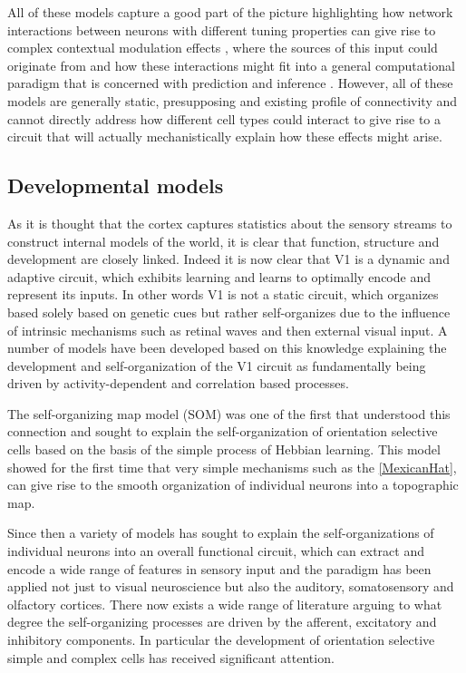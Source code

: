 All of these models capture a good part of the picture highlighting
how network interactions between neurons with different tuning
properties can give rise to complex contextual modulation effects
\citep{Li2002}, where the sources of this input could originate from
\citep{Schwabe2006} and how these interactions might fit into a
general computational paradigm that is concerned with prediction and
inference \citep{Spratling2010, Coen2015}. However, all of these
models are generally static, presupposing and existing profile of
connectivity and cannot directly address how different cell types
could interact to give rise to a circuit that will actually
mechanistically explain how these effects might arise.

\subsection{Developmental models} \label{devmodels}

As it is thought that the cortex captures statistics about the sensory
streams to construct internal models of the world, it is clear that
function, structure and development are closely linked. Indeed it is
now clear that V1 is a dynamic and adaptive circuit, which exhibits
learning and learns to optimally encode and represent its inputs. In
other words V1 is not a static circuit, which organizes based solely
based on genetic cues but rather self-organizes due to the influence
of intrinsic mechanisms such as retinal waves and then external visual
input. A number of models have been developed based on this knowledge
explaining the development and self-organization of the V1 circuit as
fundamentally being driven by activity-dependent and correlation based
processes.

The self-organizing map model (SOM) \citep{VonderMalsburg1973} was one
of the first that understood this connection and sought to explain the
self-organization of orientation selective cells based on the basis of
the simple process of Hebbian learning. This model showed for the
first time that very simple mechanisms such as the \ref{MexicanHat},
can give rise to the smooth organization of individual neurons into a
topographic map.

Since then a variety of models has sought to explain the
self-organizations of individual neurons into an overall functional
circuit, which can extract and encode a wide range of features in
sensory input and the paradigm has been applied not just to visual
neuroscience but also the auditory, somatosensory and olfactory
cortices. There now exists a wide range of literature arguing to what
degree the self-organizing processes are driven by the afferent,
excitatory and inhibitory components. In particular the development of
orientation selective simple and complex cells has received
significant attention.

